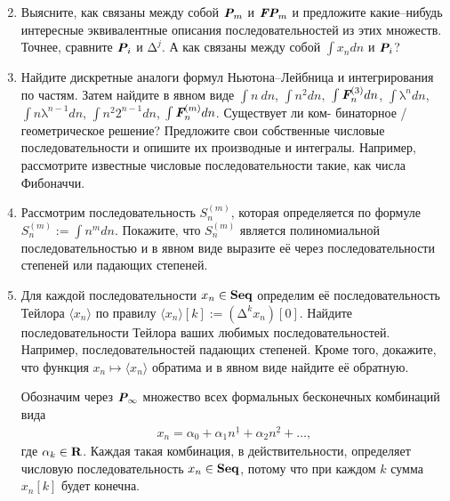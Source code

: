 \begin{enumerate}
\setcounter{enumi}{1}
\item Выясните, как связаны между собой $\text{\bfseries\itshape P}_m$ и $\text{\bfseries\itshape FP}_m$ и предложите какие--нибудь интересные эквивалентные описания последовательностей из этих множеств. Точнее, сравните $\text{\bfseries\itshape P}_i$ и $\text{Δ}^{j}$. А как связаны между собой $\int x_n dn$ и $\text{\bfseries\itshape P}_i$? 
\item Найдите дискретные аналоги формул Ньютона--Лейбница и интегрирования по частям. Затем найдите в явном виде $\int n\ dn$, $\int n^2 dn,$
$\int \text{\bfseries\itshape F}_n^{(3)} dn$,
$\int \text{λ}^n dn$,
$\int n \text{λ}^{n-1} dn$,
$\int n^2 \textrm{2}^{n-1} dn$,
$\int \text{\bfseries\itshape F}_n^{(m)} dn$. Существует ли ком- бинаторное / геометрическое решение? Предложите свои собственные числовые последовательности и опишите их производные и интегралы. Например, рассмотрите известные числовые последовательности такие, как числа Фибоначчи.

\item Рассмотрим последовательность $S_n^{(m)}$, которая определяется по формуле $S_n^{(m)} := \int n^m dn$. Покажите, что $S_n^{(m)}$ является полиномиальной последовательностью и в явном виде выразите её через последовательности степеней или падающих степеней. 

\item Для каждой последовательности $x_n \in \text{\bfseries Seq}$ определим её последовательность Тейлора $\langle x_n \rangle$ по правилу $\langle x_n \rangle [k] := (\text{Δ}^k x_n)[0]$. Найдите последовательности Тейлора ваших любимых последовательностей. Например, последовательностей падающих степеней. Кроме того, докажите, что функция $x_n \mapsto \langle x_n \rangle$ обратима и в явном виде найдите её обратную.

Обозначим через $\text{\bfseries\itshape P}_\infty$ множество всех формальных бесконечных комбинаций вида
\begin{align*}
x_n = \alpha_0 + \alpha_1 n^{\underline{1}} + \alpha_2 n^{\underline{2}} + \ldots,
\end{align*}
где $\alpha_k \in \text{\bfseries R}$. Каждая такая комбинация, в действительности, определяет числовую последовательность $x_n \in \text{\bfseries Seq}$, потому что при каждом $k$ сумма $x_n[k]$ будет конечна.


\end{enumerate}
